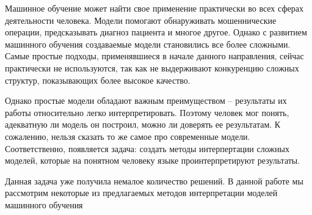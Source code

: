 Машинное обучение может найти свое применение практически во всех сферах деятельности человека. Модели помогают обнаруживать мошеннические операции, предсказывать диагноз пациента и многое другое. Однако с развитием машинного обучения создаваемые модели становились все более сложными. Самые простые подходы, применявшиеся в начале данного направления, сейчас практически не используются, так как не выдерживают конкуренцию сложных структур, показывающих более высокое качество.

Однако простые модели обладают важным преимуществом -- результаты их работы относительно легко интерпретировать. Поэтому человек мог понять, адекватную ли модель он построил, можно ли доверять ее результатам. К сожалению, нельзя сказать то же самое про современные модели. Соответственно, появляется задача: создать методы интерпертации сложных моделей, которые на понятном человеку языке проинтерпретируют результаты.

Данная задача уже получила немалое количество решений. В данной работе мы рассмотрим некоторые из предлагаемых методов интерпретации моделей машинного обучения



